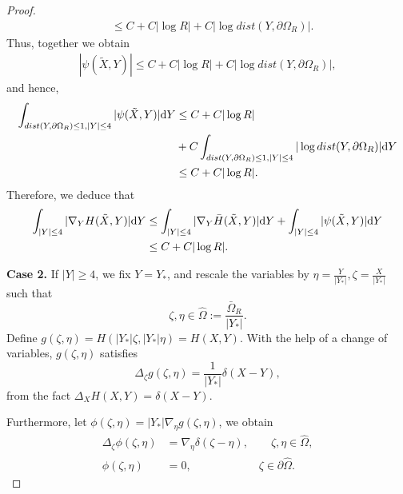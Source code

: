 \documentclass[11pt,reqno]{amsart}%
\theoremstyle{definition}
\theoremstyle{remark}
\begin{document}
\begin{proof}
\begin{align}
&\leq C+ C |\log R|+C|\log dist(Y,\partial\Omega_{R})|.\nonumber
\end{align}
Thus, together we obtain
\begin{align}
|\psi(\tilde{X},Y)|\leq C+ C |\log R|+C|\log dist(Y,\partial\Omega_{R})|,\nonumber
\end{align}
and hence,
\begin{align}
\int_{dist(Y,\partial\Omega_{R})\leq 1, |Y|\leq 4}|\psi(\tilde{X},Y)|{\rm d}Y&\leq C + C |\log R|\nonumber\\
&+C\int_{dist(Y,\partial\Omega_{R})\leq 1, |Y|\leq 4}|\log dist(Y,\partial\Omega_{R})|{\rm d}Y\nonumber\\
&\leq C+ C |\log R|.\nonumber
\end{align}
Therefore,  we deduce that
\begin{align}
\int_{ |Y|\leq 4}|\nabla_{Y}H(\tilde{X},Y)|{\rm d}Y&\leq \int_{ |Y|\leq 4}|\nabla_{Y}\bar{H}(\tilde{X},Y)|{\rm d}Y +\int_{ |Y|\leq 4}|\psi(\tilde{X},Y)|{\rm d}Y\nonumber\\
&\leq C+C|\log R|. \nonumber
\end{align}

{\bf Case 2.}  If $|Y|\geq 4$, we fix $Y=Y_{*}$, and rescale the  variables by $\eta=\frac{Y}{|Y_{*}|}, \zeta=\frac{X}{|Y_{*}|}$ such that 
$$\zeta,\eta\in \hat{\Omega}:=\frac{\bar{\Omega}_{R}}{|Y_{*}|}.$$
Define $g(\zeta,\eta)=H(|Y_{*}|\zeta,|Y_{*}|\eta)=H(X,Y)$. With the help of a change of variables, $g(\zeta,\eta)$ satisfies
$$\Delta_{\zeta}g(\zeta,\eta)=\frac{1}{|Y_{*}|}\delta(X-Y),$$
from the fact $\Delta_{X}H(X,Y)=\delta(X-Y)$.

Furthermore, let $\phi(\zeta,\eta)=|Y_{*}|\nabla_{\eta}g(\zeta,\eta)$, we obtain
\begin{align}
\Delta_{\zeta}\phi(\zeta,\eta)&=\nabla_{\eta}\delta(\zeta-\eta),\qquad   \zeta,\eta\in\hat{\Omega},\nonumber\\
\phi(\zeta,\eta)&=0,\qquad\qquad\qquad \zeta\in\partial\hat{\Omega}.\nonumber
\end{align}


\end{proof}
\end{document}
